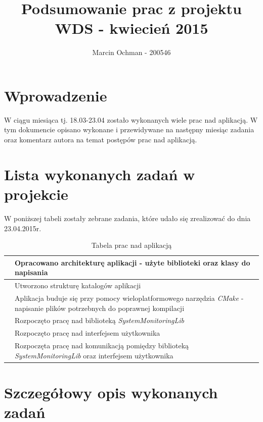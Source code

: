 \documentclass[a4paper]{article}
\title{\textbf{Podsumowanie prac z projektu WDS - kwiecień 2015}}
\author{Marcin Ochman - 200546}
\date{}
\newcounter{counter}
\newcommand\rownumber{\stepcounter{counter}\arabic{counter}}
\begin{document}


\newpage

\tableofcontents
\listoffigures
\listoftables

\newpage

\section{Wprowadzenie}

W ciągu miesiąca tj. 18.03-23.04 zostało wykonanych wiele prac nad aplikacją. W tym dokumencie opisano wykonane i przewidywane na następny miesiąc zadania oraz komentarz autora na temat postępów prac nad aplikacją.

\section{Lista wykonanych zadań w projekcie}

W poniższej tabeli zostały zebrane zadania, które udało się zrealizować do dnia 23.04.2015r.

\begin{table}[h]
\centering
\begin{tabularx}{0.7\linewidth}{ |c|X| }
			\hline 
			\rownumber & Opracowano architekturę aplikacji - użyte biblioteki oraz 
						 klasy do napisania\\ \hline
			\rownumber & Utworzono strukturę katalogów aplikacji \\ \hline
			\rownumber & Aplikacja buduje się przy pomocy wieloplatformowego narzędzia 
						 \textit{CMake} - napisanie plików potrzebnych do poprawnej kompilacji \\ \hline
			\rownumber & Rozpoczęto pracę nad biblioteką \textit{SystemMonitoringLib} \\ \hline
			\rownumber & Rozpoczęto pracę nad interfejsem użytkownika \\ \hline
			\rownumber & Rozpoczęta pracę nad komunikacją pomiędzy biblioteką \textit{SystemMonitoringLib} oraz interfejsem użytkownika \\ \hline
	\end{tabularx}
	\caption{Tabela prac nad aplikacją}
\end{table}

\section{Szczegółowy opis wykonanych zadań}
\end{document}

